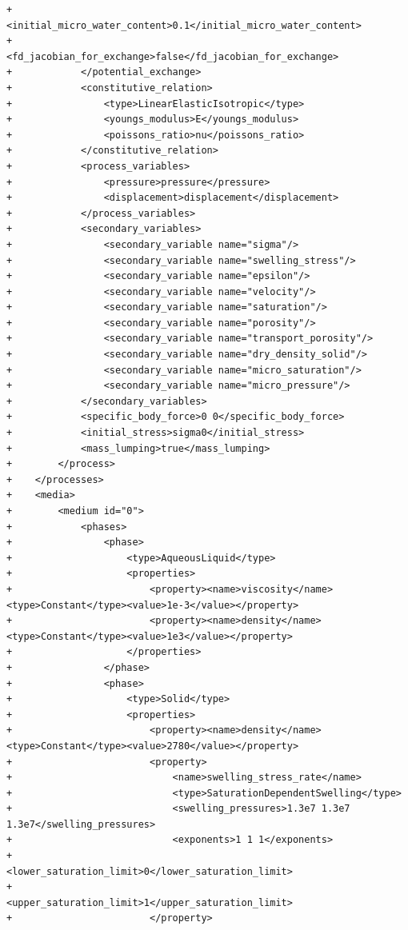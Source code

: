 \documentclass[10pt]{article}
\begin{document}
\begin{lstlisting}
+                <initial_micro_water_content>0.1</initial_micro_water_content>
+                <fd_jacobian_for_exchange>false</fd_jacobian_for_exchange>
+            </potential_exchange>
+            <constitutive_relation>
+                <type>LinearElasticIsotropic</type>
+                <youngs_modulus>E</youngs_modulus>
+                <poissons_ratio>nu</poissons_ratio>
+            </constitutive_relation>
+            <process_variables>
+                <pressure>pressure</pressure>
+                <displacement>displacement</displacement>
+            </process_variables>
+            <secondary_variables>
+                <secondary_variable name="sigma"/>
+                <secondary_variable name="swelling_stress"/>
+                <secondary_variable name="epsilon"/>
+                <secondary_variable name="velocity"/>
+                <secondary_variable name="saturation"/>
+                <secondary_variable name="porosity"/>
+                <secondary_variable name="transport_porosity"/>
+                <secondary_variable name="dry_density_solid"/>
+                <secondary_variable name="micro_saturation"/>
+                <secondary_variable name="micro_pressure"/>
+            </secondary_variables>
+            <specific_body_force>0 0</specific_body_force>
+            <initial_stress>sigma0</initial_stress>
+            <mass_lumping>true</mass_lumping>
+        </process>
+    </processes>
+    <media>
+        <medium id="0">
+            <phases>
+                <phase>
+                    <type>AqueousLiquid</type>
+                    <properties>
+                        <property><name>viscosity</name><type>Constant</type><value>1e-3</value></property>
+                        <property><name>density</name><type>Constant</type><value>1e3</value></property>
+                    </properties>
+                </phase>
+                <phase>
+                    <type>Solid</type>
+                    <properties>
+                        <property><name>density</name><type>Constant</type><value>2780</value></property>
+                        <property>
+                            <name>swelling_stress_rate</name>
+                            <type>SaturationDependentSwelling</type>
+                            <swelling_pressures>1.3e7 1.3e7 1.3e7</swelling_pressures>
+                            <exponents>1 1 1</exponents>
+                            <lower_saturation_limit>0</lower_saturation_limit>
+                            <upper_saturation_limit>1</upper_saturation_limit>
+                        </property>

\end{lstlisting}
\end{document}
